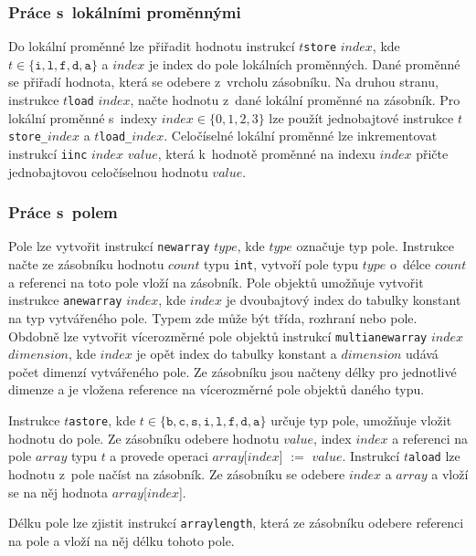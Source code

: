 \subsubsection{Práce s~lokálními proměnnými}

Do lokální proměnné lze přiřadit hodnotu instrukcí $t$\texttt{store} $index$, kde $t \in \{ \texttt{i}, \texttt{l}, \texttt{f}, \texttt{d}, \texttt{a} \}$ a $index$ je index do pole lokálních proměnných. Dané proměnné se přiřadí hodnota, která se odebere z~vrcholu zásobníku. Na druhou stranu, instrukce $t$\texttt{load} $index$, načte hodnotu z~dané lokální proměnné na zásobník. Pro lokální proměnné s~indexy $index \in \{0,1,2,3\}$ lze použít jednobajtové instrukce $t$\texttt{store\_}$index$ a $t$\texttt{load\_}$index$.
Celočíselné lokální proměnné lze inkrementovat instrukcí \texttt{iinc} $index$ $value$, která k~hodnotě proměnné na indexu $index$ přičte jednobajtovou celočíselnou hodnotu $value$.

\subsubsection{Práce s~polem}

Pole lze vytvořit instrukcí \texttt{newarray} $type$, kde $type$ označuje typ pole. Instrukce načte ze zásobníku hodnotu $count$ typu \texttt{int}, vytvoří pole typu $type$ o~délce $count$ a referenci na toto pole vloží na zásobník. Pole objektů umožňuje vytvořit instrukce \texttt{anewarray} $index$, kde $index$ je dvoubajtový index do tabulky konstant na typ vytvářeného pole. Typem zde může být třída, rozhraní nebo pole. Obdobně lze vytvořit vícerozměrné pole objektů instrukcí \texttt{multianewarray} $index$ $dimension$, kde $index$ je opět index do tabulky konstant a $dimension$ udává počet dimenzí vytvářeného pole. Ze zásobníku jsou načteny délky pro jednotlivé dimenze a je vložena reference na vícerozměrné pole objektů daného typu.

Instrukce $t$\texttt{astore}, kde $t \in \{\texttt{b}, \texttt{c}, \texttt{s}, \texttt{i}, \texttt{l}, \texttt{f},  \texttt{d}, \texttt{a}  \}$ určuje typ pole, umožňuje vložit hodnotu do pole. Ze zásobníku odebere hodnotu $value$, index $index$ a referenci na pole $array$ typu $t$ a provede operaci $array$[$index$] $:=$ $value$.
Instrukcí $t$\texttt{aload} lze hodnotu z~pole načíst na zásobník. Ze zásobníku se odebere $index$ a $array$ a vloží se na něj hodnota $array$[$index$]. 

Délku pole lze zjistit instrukcí \texttt{arraylength}, která ze zásobníku odebere referenci na pole a vloží na něj délku tohoto pole.

